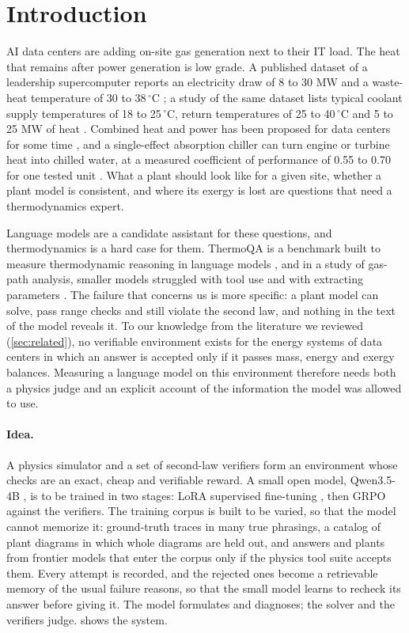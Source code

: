 \section{Introduction}\label{sec:intro}

AI data centers are adding on-site gas generation next to their IT load. The heat that remains
after power generation is low grade. A published dataset of a leadership supercomputer reports an
electricity draw of 8 to 30 MW and a waste-heat temperature of 30 to 38\,$^\circ$C
\citep{sun2024frontier}; a study of the same dataset lists typical coolant supply temperatures of
18 to 25\,$^\circ$C, return temperatures of 25 to 40\,$^\circ$C and 5 to 25 MW of heat
\citep{jadhav2026frontierml}. Combined heat and power has been proposed for data centers for some
time \citep{darrow2009chp}, and a single-effect absorption chiller can turn engine or turbine heat
into chilled water, at a measured coefficient of performance of 0.55 to 0.70 for one tested unit
\citep{ochoa2019absorption}. What a plant should look like for a given site, whether a plant model
is consistent, and where its exergy is lost are questions that need a thermodynamics expert.

Language models are a candidate assistant for these questions, and thermodynamics is a hard case
for them. ThermoQA is a benchmark built to measure thermodynamic reasoning in language models
\citep{duzkar2026thermoqa}, and in a study of gas-path analysis, smaller models struggled with tool
use and with extracting parameters \citep{song2024gaspath}. The failure that concerns us is more specific: a plant model can solve, pass
range checks and still violate the second law, and nothing in the text of the model reveals it.
To our knowledge from the literature we reviewed (\cref{sec:related}), no verifiable environment
exists for the energy systems of data centers in which an answer is accepted only if it passes
mass, energy and exergy balances. Measuring a language model on this environment therefore needs
both a physics judge and an explicit account of the information the model was allowed to use.

\paragraph{Idea.}
A physics simulator and a set of second-law verifiers form an environment whose checks are an
exact, cheap and verifiable reward. A small open model, Qwen3.5-4B \citep{qwen2026qwen35}, is to be
trained in two stages: LoRA supervised fine-tuning \citep{hu2021lora}, then GRPO \citep{shao2024deepseekmath} against the
verifiers. The training corpus is built to be varied, so that the model cannot memorize it: ground-truth traces in many true phrasings, a catalog of plant diagrams in which whole diagrams are held out, and answers and plants from frontier models that enter the corpus only if the physics tool suite accepts them.
Every attempt is recorded, and the rejected ones become a retrievable memory of the usual failure reasons, so that the small model learns to recheck its answer before giving it. The model formulates and diagnoses; the solver and the verifiers judge. 
shows the system.


